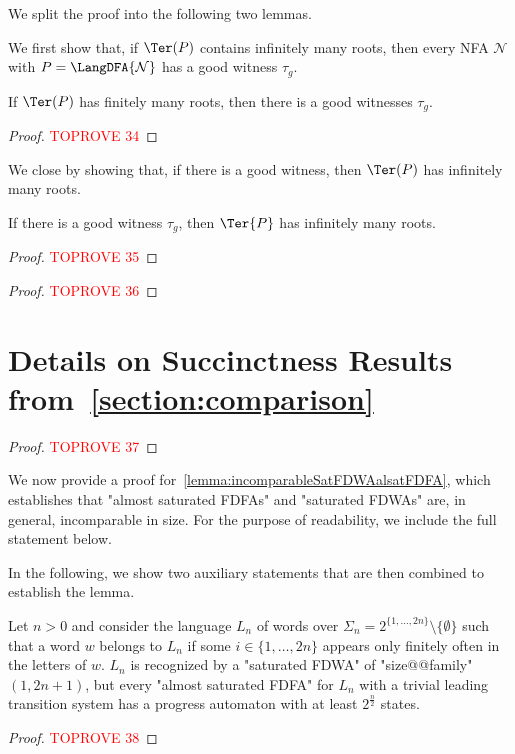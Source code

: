 \documentclass[a4paper,USenglish,cleveref,autoref,thm-restate]{lipics-v2021}
\newcommand{\mc}[1]{\ensuremath{\mathcal{#1}}}
\newcommand{\N}{\mc{N}}
\begin{document}
{We split the proof into the following two lemmas.

We first show that, if $\Ter(P)$ contains infinitely many roots, then every NFA $\N$ with $P = \LangDFA{\N}$ has a good witness $\tau_g$.

\begin{lemma}
    If $\Ter(P)$ has finitely many roots, then there is a good witnesses $\tau_g$.
\end{lemma}

\begin{proof}\textcolor{red}{TOPROVE 34}\end{proof}

We close by showing that, if there is a good witness, then $\Ter(P)$ has infinitely many roots.
\begin{lemma}
    If there is a good witness $\tau_g$, then
    $\Ter{P}$ has infinitely many roots.
\end{lemma}

\begin{proof}\textcolor{red}{TOPROVE 35}\end{proof}

\rstIsItGood*

\begin{proof}\textcolor{red}{TOPROVE 36}\end{proof} \section{Details on Succinctness Results from~\cref{section:comparison}}
\label{section:appendixcomparison}
\lowerboundCombinedToSatFDFA*
\begin{proof}\textcolor{red}{TOPROVE 37}\end{proof}

We now provide a proof for~\cref{lemma:incomparableSatFDWAalsatFDFA}, which establishes that "almost saturated FDFAs" and "saturated FDWAs" are, in general, incomparable in size.
For the purpose of readability, we include the full statement below.

\incomparableSatFDWAalsatFDFA*

In the following, we show two auxiliary statements that are then combined to establish the lemma.

\begin{lemma}
    Let $n > 0$ and consider the language $L_n$ of words over $\Sigma_n = 2^{\{1,\dots,2n\}} \setminus \{\emptyset\}$ such that a word $w$ belongs to $L_n$ if some $i \in \{1,\dots,2n\}$ appears only finitely often in the letters of $w$.
    $L_n$ is recognized by a "saturated FDWA" of "size@@family" $(1,2n+1)$, but every "almost saturated FDFA" for $L_n$ with a trivial leading transition system has a progress automaton with at least $2^{\frac{n}{2}}$ states.
    \label{helper:incomparableSatFDWAalsatFDFA:first}
\end{lemma}
\begin{proof}\textcolor{red}{TOPROVE 38}\end{proof}

}
\end{document}
